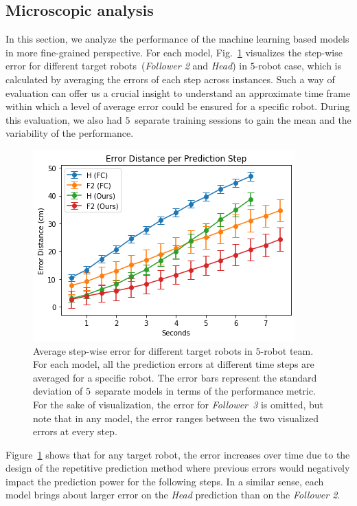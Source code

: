 \documentclass[letterpaper, 10 pt, conference]{ieeeconf}  %
\begin{document}
	\subsection{Microscopic analysis}
	\label{sec:microscopic_analysis}

    In this section, we analyze the performance of the machine learning
    based models in more fine-grained perspective. For each model,
    Fig.~\ref{fig:micro_eval} visualizes the step-wise error for
    different target robots~(\emph{Follower 2} and \emph{Head}) in
    $5$-robot case, which is calculated by averaging the errors of each
    step across instances. Such a way of evaluation can offer us a
    crucial insight to understand an approximate time frame within which
    a level of average error could be ensured for a specific robot.
    During this evaluation, we also had $5$~separate training sessions
    to gain the mean and the variability of the performance.
	\begin{figure}[t]
		\centering
		\includegraphics[width=1.\columnwidth]{fig_micro_eval}
		\caption{Average step-wise error for different target robots in $5$-robot team.
			For each model, all the prediction errors at different time steps are averaged
			for a specific robot. The error bars represent the standard deviation of
			$5$~separate models in terms of the performance metric. For the sake of
			visualization, the error for \emph{Follower~3} is omitted, but note that
			in any model, the error ranges between the two visualized errors at every step.
		}
		\label{fig:micro_eval}
	\end{figure}

    Figure~\ref{fig:micro_eval} shows that for any target robot, the
    error increases over time due to the design of the repetitive
    prediction method where previous errors would negatively impact the
    prediction power for the following steps. In a similar sense, each
    model brings about larger error on the \emph{Head} prediction than
    on the \emph{Follower 2}.
\end{document}
